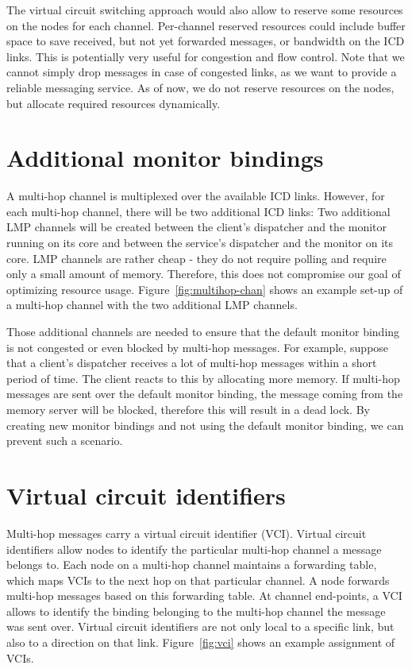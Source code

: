 \documentclass[a4paper,twoside]{report} %
\begin{document}
The virtual circuit switching approach would also allow to reserve some resources on the nodes for each channel. Per-channel reserved resources could include buffer space to save received, but not yet forwarded messages, or bandwidth on the ICD links. This is potentially very useful for congestion and flow control. Note that we cannot simply drop messages in case of congested links, as we want to provide a reliable messaging service. As of now, we do not reserve resources on the nodes, but allocate required resources dynamically.


\section{Additional monitor bindings}
A multi-hop channel is multiplexed over the available ICD links. However, for each multi-hop channel, there will be two additional ICD links: Two additional LMP channels will be created between the client's dispatcher and the monitor running on its core and between the service's dispatcher and the monitor on its core. LMP channels are rather cheap - they do not require polling and require only a small amount of memory. Therefore, this does not compromise our goal of optimizing resource usage. Figure~\ref{fig:multihop-chan} shows an example set-up of a multi-hop channel with the two additional LMP channels. 

Those additional channels are needed to ensure that the default monitor binding is not congested or even blocked by multi-hop messages. For example, suppose that a client's dispatcher receives a lot of multi-hop messages within a short period of time. The client reacts to this by allocating more memory. If multi-hop messages are sent over the default monitor binding, the message coming from the memory server will be blocked, therefore this will result in a dead lock. By creating new monitor bindings and not using the default monitor binding, we can prevent such a scenario.


\section{Virtual circuit identifiers}
\label{section:vcis}
Multi-hop messages carry a virtual circuit identifier (VCI). Virtual circuit identifiers allow nodes to identify the particular multi-hop channel a message belongs to. Each node on a multi-hop channel maintains a forwarding table, which maps VCIs to the next hop on that particular channel. A node forwards multi-hop messages based on this forwarding table. At channel end-points, a VCI allows to identify the binding belonging to the multi-hop channel the message was sent over. Virtual circuit identifiers are not only local to a specific link, but also to a direction on that link. Figure~\ref{fig:vci} shows an example assignment of VCIs.
\end{document}
